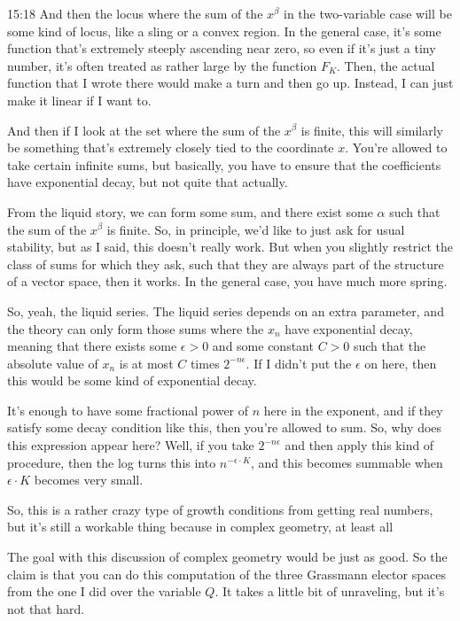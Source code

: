 \begin{unfinished}{15:18}
And then the locus where the sum of the $x^{\beta}$ in the two-variable case will be some kind of locus, like a sling or a convex region. In the general case, it's some function that's extremely steeply ascending near zero, so even if it's just a tiny number, it's often treated as rather large by the function $F_K$. Then, the actual function that I wrote there would make a turn and then go up. Instead, I can just make it linear if I want to.

And then if I look at the set where the sum of the $x^{\beta}$ is finite, this will similarly be something that's extremely closely tied to the coordinate $x$. You're allowed to take certain infinite sums, but basically, you have to ensure that the coefficients have exponential decay, but not quite that actually.

From the liquid story, we can form some sum, and there exist some $\alpha$ such that the sum of the $x^{\beta}$ is finite. So, in principle, we'd like to just ask for usual stability, but as I said, this doesn't really work. But when you slightly restrict the class of sums for which they ask, such that they are always part of the structure of a vector space, then it works. In the general case, you have much more spring.

So, yeah, the liquid series. The liquid series depends on an extra parameter, and the theory can only form those sums where the $x_n$ have exponential decay, meaning that there exists some $\epsilon > 0$ and some constant $C > 0$ such that the absolute value of $x_n$ is at most $C$ times $2^{-n\epsilon}$. If I didn't put the $\epsilon$ on here, then this would be some kind of exponential decay.

It's enough to have some fractional power of $n$ here in the exponent, and if they satisfy some decay condition like this, then you're allowed to sum. So, why does this expression appear here? Well, if you take $2^{-n\epsilon}$ and then apply this kind of procedure, then the log turns this into $n^{-\epsilon\cdot K}$, and this becomes summable when $\epsilon\cdot K$ becomes very small.

So, this is a rather crazy type of growth conditions from getting real numbers, but it's still a workable thing because in complex geometry, at least all

The goal with this discussion of complex geometry would be just as good. So the claim is that you can do this computation of the three Grassmann elector spaces from the one I did over the variable $Q$. It takes a little bit of unraveling, but it's not that hard.


\end{unfinished}
